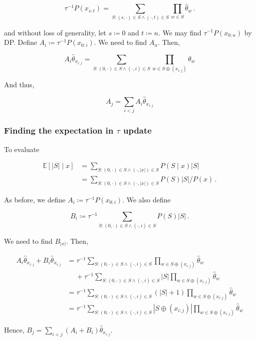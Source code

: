 \documentclass{article}
\begin{document}
\[
    \tau^{-1} P(x_{s:t}) = \sum_{S: (s, \cdot) \in S \land (\cdot, t) \in S} \prod_{w \in S} \hat{\theta}_w\,.
\]

\noindent
and without loss of generality, let $s \coloneqq 0$ and $t \coloneqq n$.
We may find $\tau^{-1} P(x_{0:n})$ by DP.
Define $A_i \coloneqq \tau^{-1} P(x_{0:i})$.
We need to find $A_n$.
Then,

\[
    A_i \hat{\theta}_{x_{i:j}} = \sum_{S:(0,\cdot) \in S \land (\cdot, i) \in S} \prod_{w \in S \oplus (x_{i:j})} \hat{\theta}_w
\]

\noindent
And thus,

\[
    A_j = \sum_{i < j} A_i \hat{\theta}_{x_{i:j}}
\]

\subsubsection{Finding the expectation in \texorpdfstring{$\tau$}{tau} update}
To evaluate

\[
    \begin{aligned}
        \mathbb{E}[|S| \mid x]
        &= \sum_{S: (0,\cdot) \in S \land (\cdot,|x|) \in S} P(S \mid x) |S|\\
        &= \sum_{S: (0,\cdot) \in S \land (\cdot,|x|) \in S} P(S) |S| \Big/ P(x)\,.
    \end{aligned}
\]

\noindent
As before, we define $A_i \coloneqq \tau^{-1} P(x_{0:i})$.
We also define

\[
    B_i \coloneqq \tau^{-1} \sum_{S:(0,\cdot) \in S \land (\cdot,i) \in S} P(S) |S|\,.
\]

\noindent
We need to find $B_{|x|}$.
Then,

\[
    \begin{aligned}
        A_i \hat{\theta}_{x_{i:j}} + B_i \hat{\theta}_{x_{i:j}}
        &= \tau^{-1} \sum_{S:(0,\cdot) \in S \land (\cdot,i) \in S} \prod_{w \in S \oplus (x_{i:j})} \hat{\theta}_w \\
        &\quad\ + \tau^{-1} \sum_{S:(0,\cdot) \in S \land (\cdot,i) \in S} |S| \prod_{w \in S \oplus (x_{i:j})} \hat{\theta}_w\\
        &= \tau^{-1} \sum_{S:(0,\cdot) \in S \land (\cdot,i) \in S} (|S|+1) \prod_{w \in S \oplus (x_{i:j})} \hat{\theta}_w\\
        &= \tau^{-1} \sum_{S:(0,\cdot) \in S \land (\cdot,i) \in S} |S \oplus (x_{i:j})| \prod_{w \in S \oplus (x_{i:j})} \hat{\theta}_w
    \end{aligned}
\]

\noindent
Hence, $B_j = \sum_{i<j}(A_i + B_i)\hat{\theta}_{x_{i:j}}$.
\end{document}
